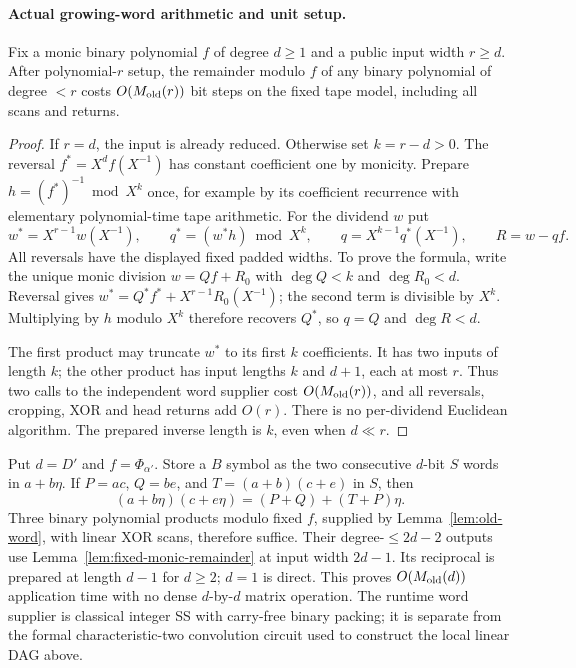 \paragraph{Actual growing-word arithmetic and unit setup.}
\begin{lemma}
\label{lem:fixed-monic-remainder}
Fix a monic binary polynomial $f$ of degree $d\ge1$ and a public input
width $r\ge d$. After polynomial-$r$ setup, the remainder modulo $f$
of any binary polynomial of degree $<r$ costs $O(M_{\rm old}(r))$
bit steps on the fixed tape model, including all scans and returns.
\end{lemma}
\begin{proof}
If $r=d$, the input is already reduced. Otherwise set $k=r-d>0$.
The reversal $f^*=X^df(X^{-1})$ has constant coefficient one by
monicity. Prepare $h=(f^*)^{-1}\bmod X^k$ once, for example by its
coefficient recurrence with elementary polynomial-time tape arithmetic.
For the dividend $w$ put
\[
 w^*=X^{r-1}w(X^{-1}),\qquad
 q^*=(w^*h)\bmod X^k,\qquad
 q=X^{k-1}q^*(X^{-1}),\qquad R=w-qf.
\]
All reversals have the displayed fixed padded widths. To prove the
formula, write the unique monic division $w=Qf+R_0$ with
$\deg Q<k$ and $\deg R_0<d$. Reversal gives
$w^*=Q^*f^*+X^{r-1}R_0(X^{-1})$; the second term is divisible by
$X^k$. Multiplying by $h$ modulo $X^k$ therefore recovers $Q^*$,
so $q=Q$ and $\deg R<d$.

The first product may truncate $w^*$ to its first $k$ coefficients.
It has two inputs of length $k$; the other product has input lengths
$k$ and $d+1$, each at most $r$. Thus two calls to the independent
word supplier cost $O(M_{\rm old}(r))$, and all reversals, cropping,
XOR and head returns add $O(r)$. There is no per-dividend Euclidean
algorithm. The prepared inverse length is $k$, even when $d\ll r$.
\end{proof}

Put $d=D'$ and $f=\Phi_{\alpha'}$. Store a $B$ symbol as the two
consecutive $d$-bit $S$ words in $a+b\eta$. If
$P=ac$, $Q=be$, and $T=(a+b)(c+e)$ in $S$, then
\[
 (a+b\eta)(c+e\eta)=(P+Q)+(T+P)\eta.
\]
Three binary polynomial products modulo fixed $f$, supplied by
Lemma~\ref{lem:old-word}, with linear XOR scans, therefore suffice.
Their degree-$\le2d-2$ outputs use
Lemma~\ref{lem:fixed-monic-remainder} at input width $2d-1$.
Its reciprocal is prepared at length $d-1$ for $d\ge2$; $d=1$
is direct. This proves $O(M_{\rm old}(d))$ application time with
no dense $d$-by-$d$ matrix operation.
The runtime word supplier is classical integer SS with carry-free
binary packing; it is separate from the formal characteristic-two
convolution circuit used to construct the local linear DAG above.

